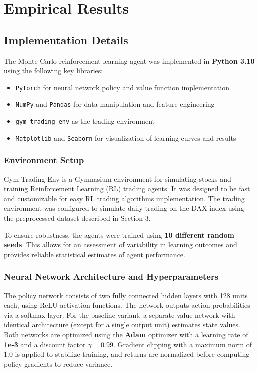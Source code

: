 \section{Empirical Results}

\subsection{Implementation Details}

The Monte Carlo reinforcement learning agent was implemented in \textbf{Python 3.10} using the following key libraries:

\begin{itemize}
    \item \texttt{PyTorch} for neural network policy and value function implementation
    \item \texttt{NumPy} and \texttt{Pandas} for data manipulation and feature engineering
    \item \texttt{gym-trading-env} as the trading environment
    \item \texttt{Matplotlib} and \texttt{Seaborn} for visualization of learning curves and results
\end{itemize}

\subsubsection{Environment Setup}
Gym Trading Env \citep{gymtradingenv} is a Gymnasium environment for simulating stocks and training Reinforcement Learning (RL) trading agents. It was designed to be fast and customizable for easy RL trading algorithms implementation. The trading environment was configured to simulate daily trading on the DAX index using the preprocessed dataset described in Section 3.

To ensure robustness, the agents were trained using \textbf{10 different random seeds}. This allows for an assessment of variability in learning outcomes and provides reliable statistical estimates of agent performance. 

\subsubsection{Neural Network Architecture and Hyperparameters}
The policy network consists of two fully connected hidden layers with 128 units each, using ReLU activation functions. The network outputs action probabilities via a softmax layer. For the baseline variant, a separate value network with identical architecture (except for a single output unit) estimates state values. Both networks are optimized using the \textbf{Adam} optimizer with a learning rate of \textbf{1e-3} and a discount factor $\gamma = 0.99$. Gradient clipping with a maximum norm of 1.0 is applied to stabilize training, and returns are normalized before computing policy gradients to reduce variance.

